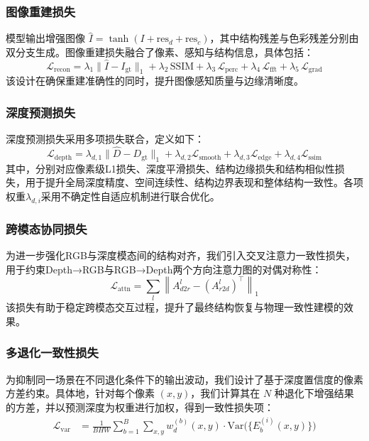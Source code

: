 \documentclass[twocolumn]{article}
\begin{document}
\subsubsection{图像重建损失}
模型输出增强图像 $ \hat{I} = \tanh(I + \mathrm{res}_d + \mathrm{res}_c)$，其中结构残差与色彩残差分别由双分支生成。图像重建损失融合了像素、感知与结构信息，具体包括：
\[
\mathcal{L}_{\text{recon}} = \lambda_1 \|\hat{I} - I_{\text{gt}}\|_1 + \lambda_2\,\mathrm{SSIM} + \lambda_3\,\mathcal{L}_{\text{perc}} + \lambda_4\,\mathcal{L}_{\text{fft}} + \lambda_5\,\mathcal{L}_{\text{grad}}
\]
该设计在确保重建准确性的同时，提升图像感知质量与边缘清晰度。

\subsubsection{深度预测损失}

深度预测损失采用多项损失联合，定义如下：
\begin{equation}
\mathcal{L}_{\text{depth}} = \lambda_{d,1} \|\hat{D} - D_{\text{gt}}\|_1
+ \lambda_{d,2} \mathcal{L}_{\text{smooth}}
+ \lambda_{d,3} \mathcal{L}_{\text{edge}}
+ \lambda_{d,4} \mathcal{L}_{\text{ssim}}
\end{equation}
其中，分别对应像素级L1损失、深度平滑损失、结构边缘损失和结构相似性损失，用于提升全局深度精度、空间连续性、结构边界表现和整体结构一致性。各项权重$\lambda_{d,i}$采用不确定性自适应机制进行联合优化。




\subsubsection{跨模态协同损失}
为进一步强化RGB与深度模态间的结构对齐，我们引入交叉注意力一致性损失，用于约束Depth→RGB与RGB→Depth两个方向注意力图的对偶对称性：
\[
\mathcal{L}_{\text{attn}} = \sum_l \left\|A_{d2r}^{l} - (A_{r2d}^{l})^\top \right\|_1
\]
该损失有助于稳定跨模态交互过程，提升了最终结构恢复与物理一致性建模的效果。

\subsubsection{多退化一致性损失}

为抑制同一场景在不同退化条件下的输出波动，我们设计了基于深度置信度的像素方差约束。具体地，针对每个像素 $(x, y)$，我们计算其在 $N$ 种退化下增强结果的方差，并以预测深度为权重进行加权，得到一致性损失项：
\begin{align}
\mathcal{L}_{\mathrm{var}}
&= \frac{1}{BHW} \sum_{b=1}^B \sum_{x,y}
    w_d^{(b)}(x,y)\cdot
    \mathrm{Var}\bigl(\{E^{(i)}_b(x,y)\}\bigr)
\end{align}
\end{document}
